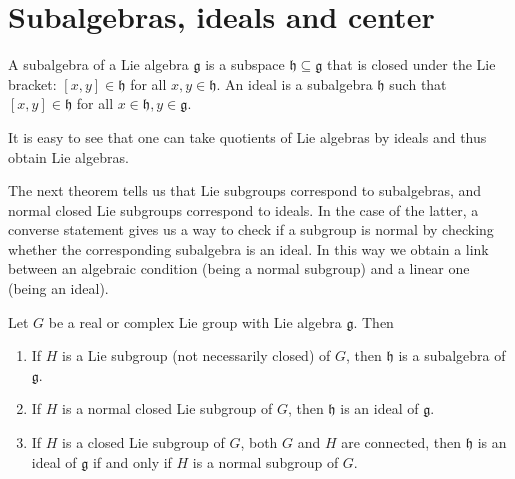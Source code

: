 \documentclass{report}
\begin{document}
\section{Subalgebras, ideals and center}
\begin{definition}
    A subalgebra of a Lie algebra $\mathfrak g$ is a subspace $\mathfrak h \subseteq \mathfrak g$ that is closed under the Lie bracket: $[x,y] \in \mathfrak h$ for all $x,y \in \mathfrak h$.
    An ideal is a subalgebra $\mathfrak h$ such that $[x,y] \in \mathfrak h$ for all $x \in \mathfrak h, y \in \mathfrak g$.
\end{definition}
It is easy to see that one can take quotients of Lie algebras by ideals and thus obtain Lie algebras.

The next theorem tells us that Lie subgroups correspond to subalgebras, and normal closed Lie subgroups correspond to ideals.
In the case of the latter, a converse statement gives us a way to check if a subgroup is normal by checking whether the corresponding subalgebra is an ideal.
In this way we obtain a link between an algebraic condition (being a normal subgroup) and a linear one (being an ideal).
\begin{theorem}
    Let $G$ be a real or complex Lie group with Lie algebra $\mathfrak g$.
    Then
    \begin{enumerate}[label = (\roman*)]
        \item If $H$ is a Lie subgroup (not necessarily closed) of $G$, then $\mathfrak h$ is a subalgebra of $\mathfrak g$.
        \item If $H$ is a normal closed Lie subgroup of $G$, then $\mathfrak h$ is an ideal of $\mathfrak g$.
        \item If $H$ is a closed Lie subgroup of $G$, both $G$ and  $H$ are connected, then $\mathfrak h$ is an ideal of $\mathfrak g$ if and only if $H$ is a normal subgroup of $G$.
    \end{enumerate}
\end{theorem}
\end{document}
